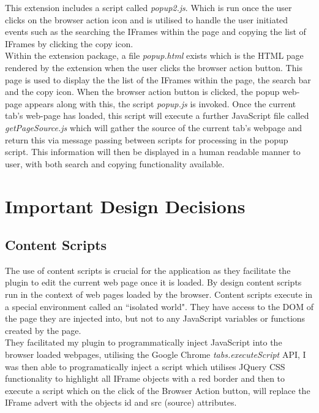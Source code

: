 \documentclass[12pt]{article}
\begin{document}
This extension includes a script called \textit{popup2.js}. Which is run once the user clicks on the browser action icon and is utilised to handle the user initiated events such as the searching the IFrames within the page and copying the list of IFrames by clicking the copy icon. \\

Within the extension package, a file \textit{popup.html} exists which is the HTML page rendered by the extension when the user clicks the browser action button. This page is used to display the the list of the IFrames within the page, the search bar and the copy icon. When the browser action button is clicked, the popup web-page appears along with this, the script \textit{popup.js} is invoked. Once the current tab's web-page has loaded, this script will execute a further JavaScript file called \textit{getPageSource.js} which will gather the source of the current tab's webpage and return this via message passing between scripts for processing in the popup script. This information will then be displayed in a human readable manner to user, with both search and copying functionality available.

\pagebreak

\section{Important Design Decisions}

\subsection{Content Scripts} \label{Content_Scripts}
The use of content scripts is crucial for the application as they facilitate the plugin to edit the current web page once it is loaded. By design content scripts run in the context of web pages loaded by the browser. Content scripts execute in a special environment called an ``isolated world". They have access to the DOM of the page they are injected into, but not to any JavaScript variables or functions created by the page. \\ 

They facilitated my plugin to programmatically inject JavaScript into the browser loaded webpages, utilising the Google Chrome \textit{tabs.executeScript} API, I was then able to programatically inject a script which utilises JQuery CSS functionality to highlight all IFrame objects with a red border and then to execute a script which on the click of the Browser Action button, will replace the IFrame advert with the objects id and src (source) attributes.  \\
\end{document}
